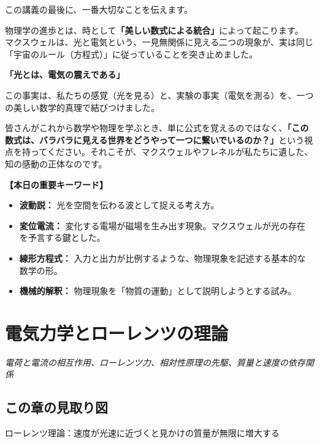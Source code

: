 \documentclass[a4paper,11pt,openany]{ltjsbook}
\begin{document}
\begin{lecturebox}
この講義の最後に、一番大切なことを伝えます。

物理学の進歩とは、時として\textbf{「美しい数式による統合」}によって起こります。
マクスウェルは、光と電気という、一見無関係に見える二つの現象が、実は同じ「宇宙のルール（方程式）」に従っていることを突き止めました。

\textbf{「光とは、電気の震えである」}

この事実は、私たちの感覚（光を見る）と、実験の事実（電気を測る）を、一つの美しい数学的真理で結びつけました。

皆さんがこれから数学や物理を学ぶとき、単に公式を覚えるのではなく、\textbf{「この数式は、バラバラに見える世界をどうやって一つに繋いでいるのか？」}という視点を持ってください。それこそが、マクスウェルやフレネルが私たちに遺した、知の感動の正体なのです。

\textbf{【本日の重要キーワード】}
\begin{itemize}[leftmargin=2em]
\item \textbf{波動説：} 光を空間を伝わる波として捉える考え方。
\item \textbf{変位電流：} 変化する電場が磁場を生み出す現象。マクスウェルが光の存在を予言する鍵とした。
\item \textbf{線形方程式：} 入力と出力が比例するような、物理現象を記述する基本的な数学の形。
\item \textbf{機械的解釈：} 物理現象を「物質の運動」として説明しようとする試み。
\end{itemize}
\end{lecturebox}


\clearpage
\chapter{電気力学とローレンツの理論}
\begin{center}\large\textit{電荷と電流の相互作用、ローレンツ力、相対性原理の先駆、質量と速度の依存関係}\end{center}

\section*{この章の見取り図}
\begin{center}


\small ローレンツ理論：速度が光速に近づくと見かけの質量が無限に増大する
\end{center}
\end{document}
